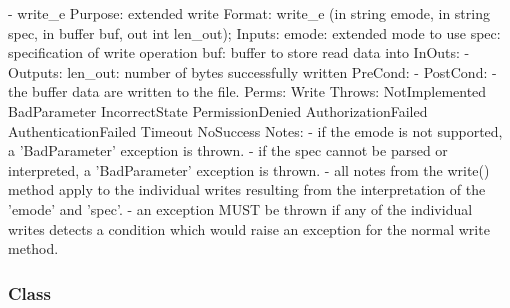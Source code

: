 \begin{myspec}
 
    - write_e
      Purpose:  extended write
      Format:   write_e            (in    string      emode, 
                                    in    string      spec, 
                                    in    buffer      buf,  
                                    out   int         len_out); 
      Inputs:   emode:              extended mode to use
                spec:               specification of write 
                                    operation
                buf:                buffer to store read data
                                    into
      InOuts:   -
      Outputs:  len_out:            number of bytes successfully
                                    written
      PreCond:  -
      PostCond: - the buffer data are written to the file.
      Perms:    Write
      Throws:   NotImplemented
                BadParameter
                IncorrectState
                PermissionDenied
                AuthorizationFailed
                AuthenticationFailed
                Timeout
                NoSuccess
      Notes:    - if the emode is not supported, a 'BadParameter'
                  exception is thrown.
                - if the spec cannot be parsed or interpreted,
                  a 'BadParameter' exception is thrown.
                - all notes from the write() method apply to the
                  individual writes resulting from the
                  interpretation of the 'emode' and 'spec'.
                - an exception MUST be thrown if any of the
                  individual writes detects a condition which
                  would raise an exception for the normal write
                  method.
 \end{myspec}
 
 
  \subsubsection*{Class }
 
